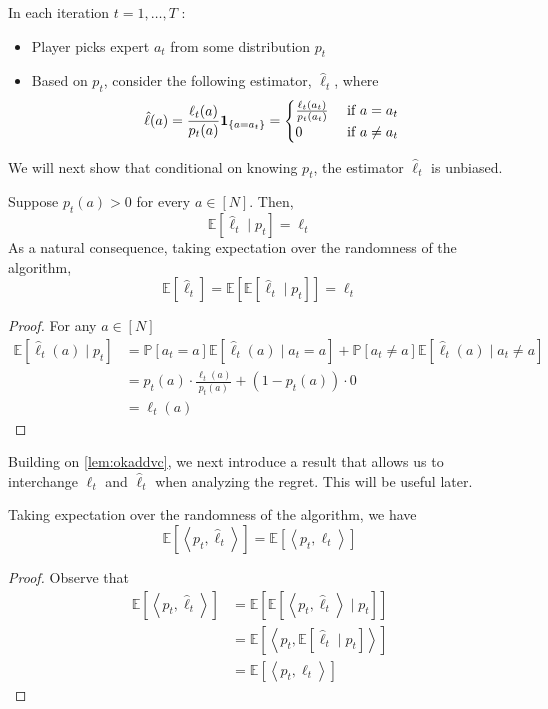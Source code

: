 \documentclass{article}
\begin{document}
In each iteration $t=1, \ldots, T$ :
\begin{itemize}
    \item Player picks expert $a_{t}$ from some distribution $p_{t}$
    \item Based on $p_{t}$, consider the following estimator, $\hat{\ell}_{t}$, where
$$
\hat{\ell}(a)=\frac{\ell_{t}(a)}{p_{t}(a)} {\bf 1}_{\left\{a=a_{t}\right\}}= \begin{cases}\frac{\ell_{t}\left(a_{t}\right)}{p_{t}\left(a_{t}\right)} & \text { if } a=a_{t} \\ 0 & \text { if } a \neq a_{t}\end{cases}
$$
\end{itemize}
 We will next show that conditional on knowing $p_{t}$, the estimator $\hat{\ell}_{t}$ is unbiased.
\begin{lema}\label{lem:okaddvc}
  Suppose $p_{t}(a)>0$ for every $a \in[N]$. Then,
$$
\mathbb{E}\left[\hat{\ell}_{t} \mid p_{t}\right]=\ell_{t}
$$
As a natural consequence, taking expectation over the randomness of the algorithm,
$$
\mathbb{E}\left[\hat{\ell}_{t}\right]=\mathbb{E}\left[\mathbb{E}\left[\hat{\ell}_{t} \mid p_{t}\right]\right]=\ell_{t}
$$
\end{lema} 
\begin{proof}
  For any $a \in[N]$
$$
\begin{aligned}
\mathbb{E}\left[\hat{\ell}_{t}(a) \mid p_{t}\right] &=\mathbb{P}\left[a_{t}=a\right] \mathbb{E}\left[\hat{\ell}_{t}(a) \mid a_{t}=a\right]+\mathbb{P}\left[a_{t} \neq a\right] \mathbb{E}\left[\hat{\ell}_{t}(a) \mid a_{t} \neq a\right] \\
&=p_{t}(a) \cdot \frac{\ell_{t}(a)}{p_{t}(a)}+\left(1-p_{t}(a)\right) \cdot 0 \\
&=\ell_{t}(a)
\end{aligned}
$$
\end{proof} 
Building on \cref{lem:okaddvc}, we next introduce a result that allows us to interchange $\ell_{t}$ and $\hat{\ell}_{t}$ when analyzing the regret. This will be useful later.
\begin{lema}\label{lem:iqjmsdc}
  Taking expectation over the randomness of the algorithm, we have
$$
\mathbb{E}\left[\left\langle p_{t}, \hat{\ell}_{t}\right\rangle\right]=\mathbb{E}\left[\left\langle p_{t}, \ell_{t}\right\rangle\right]
$$
\end{lema}
\begin{proof}
  Observe that
$$
\begin{aligned}
\mathbb{E}\left[\left\langle p_{t}, \hat{\ell}_{t}\right\rangle\right] &=\mathbb{E}\left[\mathbb{E}\left[\left\langle p_{t}, \hat{\ell}_{t}\right\rangle \mid p_{t}\right]\right] \\
&=\mathbb{E}\left[\left\langle p_{t}, \mathbb{E}\left[\hat{\ell}_{t} \mid p_{t}\right]\right\rangle\right] \\
&=\mathbb{E}\left[\left\langle p_{t}, \ell_{t}\right\rangle\right]
\end{aligned}
$$
\end{proof}
\end{document}
